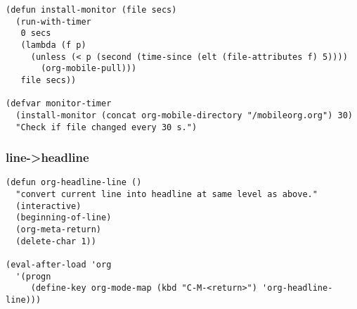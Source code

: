 \documentclass{article}
\begin{document}
\begin{verbatim}
(defun install-monitor (file secs)
  (run-with-timer
   0 secs
   (lambda (f p)
     (unless (< p (second (time-since (elt (file-attributes f) 5))))
       (org-mobile-pull)))
   file secs))

(defvar monitor-timer
  (install-monitor (concat org-mobile-directory "/mobileorg.org") 30)
  "Check if file changed every 30 s.")
\end{verbatim}
\subsubsection{line->headline}
\label{sec-2-5-7}

\begin{verbatim}
(defun org-headline-line ()
  "convert current line into headline at same level as above."
  (interactive)
  (beginning-of-line)
  (org-meta-return)
  (delete-char 1))

(eval-after-load 'org
  '(progn
     (define-key org-mode-map (kbd "C-M-<return>") 'org-headline-line)))
\end{verbatim}
\end{document}
